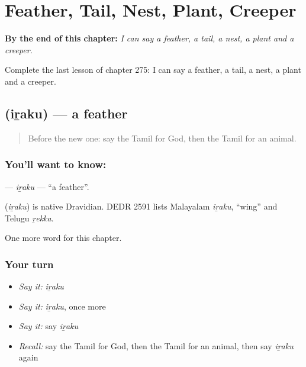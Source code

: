 
\chapter{Feather, Tail, Nest, Plant, Creeper}
\label{ch:ta-feather-tail-nest-plant-creeper}

\begin{chapteropening}
\textbf{By the end of this chapter:} \emph{I can say a feather, a tail, a nest, a plant and a creeper.}

Complete the last lesson of chapter 275: I can say a feather, a tail, a nest, a plant and a creeper.
\end{chapteropening}

\section[\texorpdfstring{\ta{இறகு} (iṟaku)}{இறகு (iṟaku)}]{ (iṟaku) — a feather}

\label{lesson:TA-C275-iraku}



\begin{quote}
Before the new one: say the Tamil for God, then the Tamil for an animal.
\end{quote}

\subsection*{You'll want to know: }
\textbf{} — \emph{iṟaku} — \textquotedblleft{}a feather\textquotedblright{}.

\begin{cousinweb}
\textbf{} (\emph{iṟaku}) is native Dravidian. DEDR 2591 lists Malayalam \emph{iṟaku}, \textquotedblleft{}wing\textquotedblright{} and Telugu \emph{ṟekka}.
\end{cousinweb}

\begin{grammarlens}[title={What you've built}]
One more word for this chapter.
\end{grammarlens}

\subsection*{Your turn}
\begin{itemize}
\raggedright
  \item \emph{Say it:} \emph{iṟaku}
  \item \emph{Say it:} \emph{iṟaku}, once more
  \item \emph{Say it:} say \emph{iṟaku}
  \item \emph{Recall:} say the Tamil for God, then the Tamil for an animal, then say \emph{iṟaku} again
\end{itemize}


